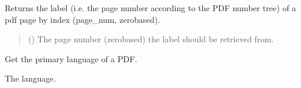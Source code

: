 \documentclass[letterpaper,10pt,english]{sphinxmanual}
\begin{document}
\begin{fulllineitems}
\begin{fulllineitems}
\end{fulllineitems}


\begin{fulllineitems}
\label{\detokenize{generated/bp_text.pdf:bp_text.pdf.PdfFile.get_page_label}}
\pysigstartsignatures
\pysiglinewithargsret
{}
{}
{}
\pysigstopsignatures
\sphinxAtStartPar
Returns the label (i.e. the page number according to the PDF number
tree) of a pdf page by index (page\_num, zero\sphinxhyphen{}based).
\begin{quote}\begin{description}
\sphinxAtStartPar
{} () \textendash{} The page number (zero\sphinxhyphen{}based) the label should be
retrieved from.

\end{description}\end{quote}

\end{fulllineitems}


\begin{fulllineitems}
\label{\detokenize{generated/bp_text.pdf:bp_text.pdf.PdfFile.get_primary_lang}}
\pysigstartsignatures
\pysiglinewithargsret
{}
{}
{}
\pysigstopsignatures
\sphinxAtStartPar
Get the primary language of a PDF.

\end{fulllineitems}


\begin{fulllineitems}
\label{\detokenize{generated/bp_text.pdf:bp_text.pdf.PdfFile.lang}}
\pysigstartsignatures
\pysigline
{}
\pysigstopsignatures
\sphinxAtStartPar
The language.

\end{fulllineitems}


\end{fulllineitems}
\end{document}
